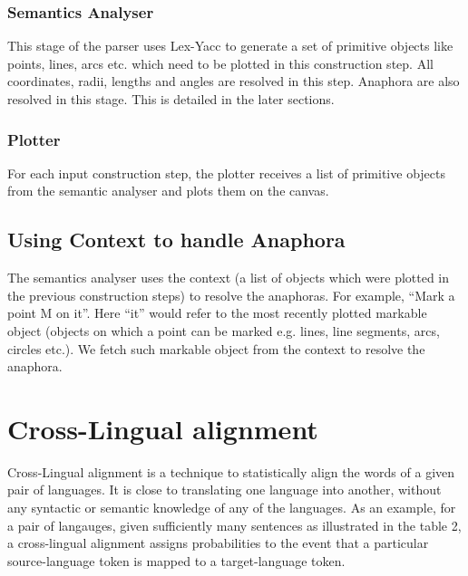 \def\DevnagVersion{2.15}\documentclass[12pt]{article}
\begin{document}
\subsubsection{Semantics Analyser}
This stage of the parser uses Lex-Yacc to generate a set of primitive objects like points, lines, arcs etc. which need to be plotted in this construction step. All coordinates, radii, lengths and angles are resolved in this step. Anaphora are also resolved in this stage. This is detailed in the later sections.

\subsubsection{Plotter}
For each input construction step, the plotter receives a list of primitive objects from the semantic analyser and plots them on the canvas.

\subsection{Using Context to handle Anaphora}
The semantics analyser uses the context (a list of objects which were plotted in the previous construction steps) to resolve the anaphoras. For example,
``Mark a point M on it''.
Here ``it'' would refer to the most recently plotted markable object (objects on which a point can be marked e.g. lines, line segments, arcs, circles etc.). We fetch such markable object from the context to resolve the anaphora.

\section{Cross-Lingual alignment}
Cross-Lingual alignment is a technique to statistically align the words of a given pair of languages. It is close to translating one language into another, without any syntactic or semantic knowledge of any of the languages. As an example, for a pair of langauges, given sufficiently many sentences as illustrated in the table 2, a cross-lingual alignment assigns probabilities to the event that a particular source-language token is mapped to a target-language token.\\
\end{document}
